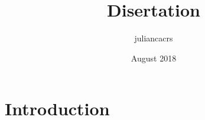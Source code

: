 \documentclass{article}
\title{Disertation}
\author{juliancacrs }
\date{August 2018}
\begin{document}
\maketitle

\section{Introduction}
\end{document}
